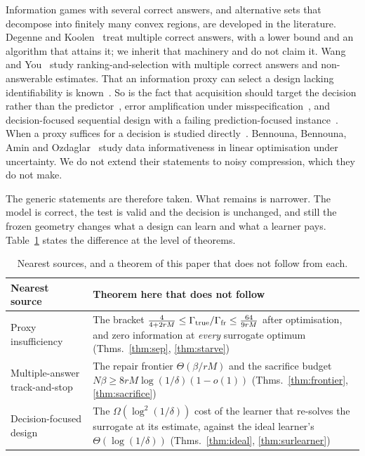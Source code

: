 Information games with several correct answers, and alternative sets that decompose into
finitely many convex regions, are developed in the literature. Degenne and
Koolen~\cite{degenne2019} treat multiple correct answers, with a lower bound and an algorithm
that attains it; we inherit that machinery and do not claim it. Wang and You~\cite{wangyou2026}
study ranking-and-selection with multiple correct answers and non-answerable estimates. That
an information proxy can select a design lacking identifiability is
known~\cite{overstall2022}. So is the fact that acquisition should target the decision rather
than the predictor~\cite{filstroff2021}, error amplification under
misspecification~\cite{tang2026}, and decision-focused sequential design with a failing
prediction-focused instance~\cite{wan2026}. When a proxy suffices for a decision is studied
directly~\cite{schutte2026}. Bennouna, Bennouna, Amin and Ozdaglar~\cite{bennouna2026} study
data informativeness in linear optimisation under uncertainty. We do not extend their
statements to noisy compression, which they do not make.

The generic statements are therefore taken. What remains is narrower. The model is correct,
the test is valid and the decision is unchanged, and still the frozen geometry changes what a
design can learn and what a learner pays. Table~\ref{tab:prior} states the difference at the
level of theorems.

\begin{table}[h]
\caption{Nearest sources, and a theorem of this paper that does not follow from each.}
\label{tab:prior}
\centering
\footnotesize
\begin{tabular}{@{}p{}p{}@{}}
\toprule
Nearest source & Theorem here that does not follow \\
\midrule
Proxy insufficiency~\cite{schutte2026,overstall2022} & The bracket
$\frac{4}{4+2rM}\le\Gamma_{\rm true}/\Gamma_{\rm fr}\le\frac{64}{9rM}$ after optimisation, and
zero information at \emph{every} surrogate optimum (Thms.~\ref{thm:sep},
\ref{thm:starve}) \\
Multiple-answer track-and-stop~\cite{degenne2019} & The repair frontier
$\Theta(\beta/rM)$ and the sacrifice budget $N\beta\ge8rM\log(1/\delta)(1-o(1))$
(Thms.~\ref{thm:frontier}, \ref{thm:sacrifice}) \\
Decision-focused design~\cite{wan2026} & The $\Omega(\log^{2}(1/\delta))$ cost of the
learner that re-solves the surrogate at its estimate, against the ideal learner's
$\Theta(\log(1/\delta))$ (Thms.~\ref{thm:ideal}, \ref{thm:surlearner}) \\
\bottomrule
\end{tabular}
\end{table}

